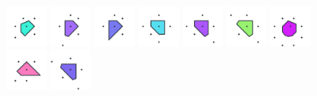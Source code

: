 \documentclass[text.tex]{subfiles}
\begin{document}
\begin{figure}[h!]
\includegraphics[width=0.12\textwidth]{img/results/octagon/octagon_103553_(-10_5alpha_2)_005.pdf}
\includegraphics[width=0.12\textwidth]{img/results/octagon/octagon_103553_(-10_5alpha_2)_006.pdf}
\includegraphics[width=0.12\textwidth]{img/results/octagon/octagon_103553_(-10_5alpha_2)_007.pdf}
\includegraphics[width=0.12\textwidth]{img/results/octagon/octagon_103553_(-10_5alpha_2)_008.pdf}
\includegraphics[width=0.12\textwidth]{img/results/octagon/octagon_103553_(-10_5alpha_2)_009.pdf}
\includegraphics[width=0.12\textwidth]{img/results/octagon/octagon_103553_(-10_5alpha_2)_010.pdf}
\includegraphics[width=0.12\textwidth]{img/results/octagon/octagon_103553_(-10_5alpha_2)_011.pdf}
\includegraphics[width=0.12\textwidth]{img/results/octagon/octagon_103553_(-10_5alpha_2)_012.pdf}
\includegraphics[width=0.12\textwidth]{img/results/octagon/octagon_103553_(-10_5alpha_2)_013.pdf}

\end{figure}
\end{document}
